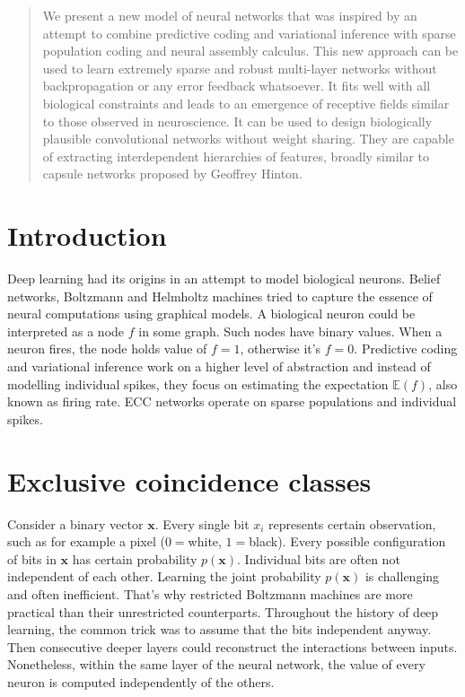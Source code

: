 \documentclass[12pt]{article}
\begin{document}
\maketitle
\lstset{
	basicstyle=\ttfamily,
	mathescape
}


\begin{abstract}
We present a new model of neural networks that was inspired by an attempt to combine predictive coding and variational inference with sparse population coding and neural assembly calculus. This new approach can be used to learn extremely sparse and robust multi-layer networks without backpropagation or any error feedback whatsoever. It fits well with all biological constraints and leads to an emergence of receptive fields similar to those observed in neuroscience. It can be used to design biologically plausible convolutional networks without weight sharing. They are capable of extracting interdependent hierarchies of features, broadly similar to capsule networks proposed by Geoffrey Hinton.
\end{abstract} 


\section{Introduction}


Deep learning had its origins in an attempt to model biological neurons. Belief networks, Boltzmann and Helmholtz machines tried to capture the essence of neural computations using graphical models. A biological neuron could be interpreted as a node $f$ in some graph. Such nodes have binary values. When a neuron fires, the node holds value of $f=1$, otherwise it's $f=0$. Predictive coding and variational inference work on a higher level of abstraction and instead of modelling individual spikes, they focus on estimating the expectation $
\mathbb{E}(f)$, also known as firing rate. ECC networks operate on sparse populations and individual spikes.

\section{Exclusive coincidence classes}

Consider a binary vector $\boldsymbol{x}$. Every single bit $x_i$ represents certain observation, such as for example a pixel ($0=$white, $1=$black). Every possible configuration of bits in $\boldsymbol{x}$ has certain probability $p(\boldsymbol{x})$. Individual bits are often not independent of each other. Learning the joint probability $p(\boldsymbol{x})$ is challenging and often inefficient. That's why restricted Boltzmann machines are more practical than their unrestricted counterparts. Throughout the history of deep learning, the common trick was to assume that the bits independent anyway. Then consecutive deeper layers could reconstruct the interactions between inputs. Nonetheless, within the same layer of the neural network, the value of every neuron is computed independently of the others. 
\end{document}
